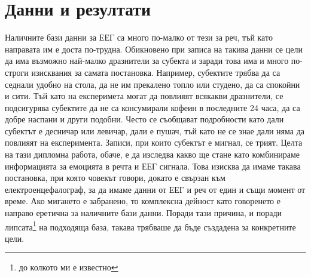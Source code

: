 \documentclass[main.tex]{subfiles}
\begin{document}
\section{Данни и резултати}
Наличните бази данни за ЕЕГ са много по-малко от тези за реч, тъй като направата им е доста по-трудна. Обикновено при записа на такива данни се цели да има възможно най-малко дразнители за субекта и заради това има и много по-строги изисквания за самата постановка. Например, субектите трябва да са седнали удобно на стола, да не им прекалено топло или студено, да са спокойни и сити. Тъй като на експеримета могат да повлияят всякакви дразнители, се подсигурява субектите да не са консумирали кофеин в последните 24 часа, да са добре наспани и други подобни. Често се съобщават подробности като дали субектът е десничар или левичар, дали е пушач, тъй като не се знае дали няма да повлияят на експеримента. Записи, при които субектът е мигнал, се трият.
Целта на тази дипломна работа, обаче, е да изследва какво ще стане като комбинираме информацията за емоцията в речта и ЕЕГ сигнала. Това изисква да имаме такава постановка, при която човекът говори, докато е свързан към електроенцефалограф, за да имаме данни от ЕЕГ и реч от един и същи момент от време. Ако мигането е забранено, то комплексна дейност като говоренето е направо еретична за наличните бази данни. Поради тази причина, и поради липсата\footnote{до колкото ми е известно} на подходяща база, такава трябваше да бъде създадена за конкретните цели.
\end{document}
